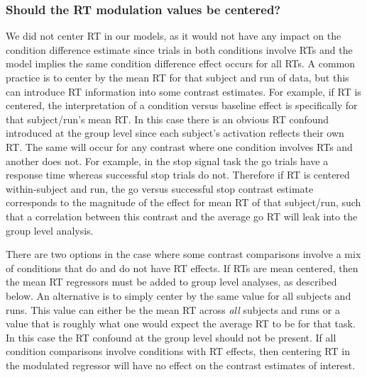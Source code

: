 \documentclass[titlepage,12pt] {article}
\begin{document}
\subsubsection*{Should the RT modulation values be centered?}
We did not center RT in our models, as it would not have any impact on the condition difference estimate since trials in both conditions involve RTs and the model implies the same condition difference effect occurs for all RTs.  A common practice is to center by the mean RT for that subject and run of data, but this can introduce RT information into some contrast estimates.  For example, if RT is centered, the interpretation of a condition versus baseline effect is specifically for that subject/run's mean RT.  In this case there is an obvious RT confound introduced at the group level since each subject's activation reflects their own RT.  The same will occur for any contrast where one condition involves RTs and another does not.  For example, in the stop signal task the go trials have a response time whereas successful stop trials do not.  Therefore if RT is centered within-subject and run, the go versus successful stop contrast estimate corresponds to the magnitude of the effect for mean RT of that subject/run, such that a correlation between this contrast and the average go RT will leak into the group level analysis.

There are two options in the case where some contrast comparisons involve a mix of conditions that do and do not have RT effects.  If RTs are mean centered, then the mean RT regressors must be added to group level analyses, as described below.  An alternative is to simply center by the same value for all subjects and runs.  This value can either be the mean RT across \emph{all} subjects and runs or a value that is roughly what one would expect the average RT to be for that task.  In this case the RT confound at the group level should not be present.  If all condition comparisons involve conditions with RT effects, then centering RT in the modulated regressor will have no effect on the contrast estimates of interest.
\end{document}

